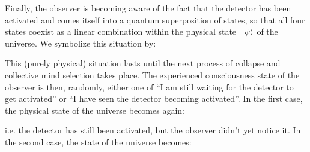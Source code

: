 \documentclass[10pt,a4paper,twoside,openany]{book}
\begin{document}
Finally, the observer is becoming aware of the fact that the detector has been activated and comes itself into a quantum superposition of states, so that all four states coexist as a linear combination within the physical state $\ \left|{\psi}\right\rangle$ of the universe. We symbolize this situation by:
\begin{flushleft}
\ExcitedAtom\hspace*{3mm}\DetectorOff\hspace*{3mm}\ObserverOff
\hspace*{3mm}\Superposition\hspace*{3mm}
\Atom\hspace*{3mm}\Photon\hspace*{3mm}\DetectorOff\hspace*{3mm}\ObserverOff
\hspace*{3mm}\Superposition\hspace*{3mm}
\Atom\hspace*{3mm}\DetectorOn\hspace*{3mm}\ObserverOff
\hspace*{3mm}\Superposition\hspace*{3mm}
\Atom\hspace*{3mm}\DetectorOn\hspace*{3mm}\ObserverOn
\end{flushleft}
This (purely physical) situation lasts until the next process of collapse and collective mind selection takes place. The experienced consciousness state of the observer is then, randomly, either one of ``I am still waiting for the detector to get activated'' or ``I have seen the detector becoming activated''. In the first case, the physical state of the universe becomes again:
\begin{flushleft}
\ExcitedAtom\hspace*{3mm}\DetectorOff\hspace*{3mm}\ObserverOff
\hspace*{3mm}\Superposition\hspace*{3mm}
\Atom\hspace*{3mm}\Photon\hspace*{3mm}\DetectorOff\hspace*{3mm}\ObserverOff
\hspace*{3mm}\Superposition\hspace*{3mm}
\Atom\hspace*{3mm}\DetectorOn\hspace*{3mm}\ObserverOff
\end{flushleft}
i.e. the detector has still been activated, but the observer didn't yet notice it. In the second case, the state of the universe becomes:
\end{document}
